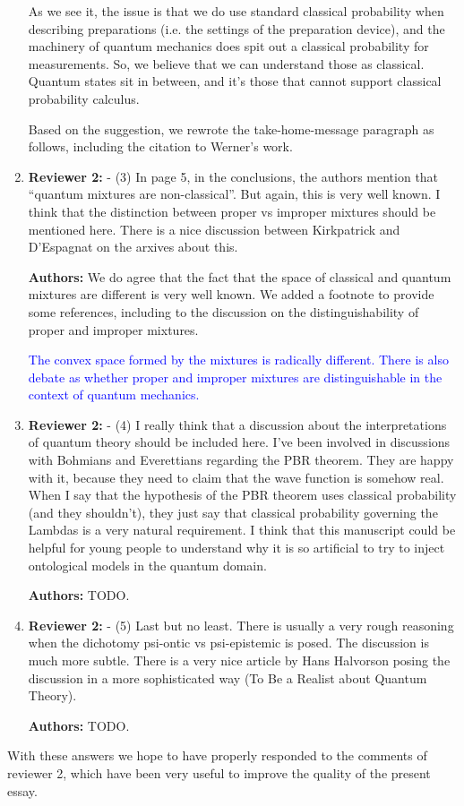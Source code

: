 \documentclass[11pt, executivepaper]{article}
\begin{document}
\begin{enumerate}
As we see it, the issue is that we do use standard classical probability when describing preparations (i.e. the settings of the preparation device), and the machinery of quantum mechanics does spit out a classical probability for measurements. So, we believe that we can understand those as classical. Quantum states sit in between, and it's those that cannot support classical probability calculus.

Based on the suggestion, we rewrote the take-home-message paragraph as follows, including the citation to Werner's work.

	
\item \textbf{Reviewer 2:} - (3)    In page 5, in the conclusions, the authors mention that “quantum mixtures are non-classical”. But again, this is very well known. I think that the distinction between proper vs improper mixtures should be mentioned here. There is a nice discussion between Kirkpatrick and D’Espagnat on the arxives about this.
\vspace{2mm}

\textbf{Authors:} We do agree that the fact that the space of classical and quantum mixtures are different is very well known. We added a footnote to provide some references, including to the discussion on the distinguishability of proper and improper mixtures.

\textcolor{blue} {The convex space formed by the mixtures is radically different\cite{bengtsson_życzkowski_2017}. There is also debate as whether proper and improper mixtures are distinguishable in the context of quantum mechanics\cite{Kirkpatrick:2001,DEspagnat:2001}.
}

\item \textbf{Reviewer 2:} - (4)    I really think that a discussion about the interpretations of quantum theory should be included here. I’ve been involved in discussions with Bohmians and Everettians regarding the PBR theorem. They are happy with it, because they need to claim that the wave function is somehow real. When I say that the hypothesis of the PBR theorem uses classical probability (and they shouldn’t), they just say that classical probability governing the Lambdas is a very natural requirement. I think that this manuscript could be helpful for young people to understand why it is so artificial to try to inject ontological models in the quantum domain.
\vspace{2mm}

\textbf{Authors:} TODO.

\item \textbf{Reviewer 2:} - (5)    Last but no least. There is usually a very rough reasoning when the dichotomy psi-ontic vs psi-epistemic is posed. The discussion is much more subtle. There is a very nice article by Hans Halvorson posing the discussion in a more sophisticated way (To Be a Realist about Quantum Theory).
\vspace{2mm}

\textbf{Authors:} TODO.

\end{enumerate}



\noindent With these answers we hope to have properly responded to the comments of reviewer 2, which have been very useful to improve the quality of the present essay.

\clearpage


\end{document}
